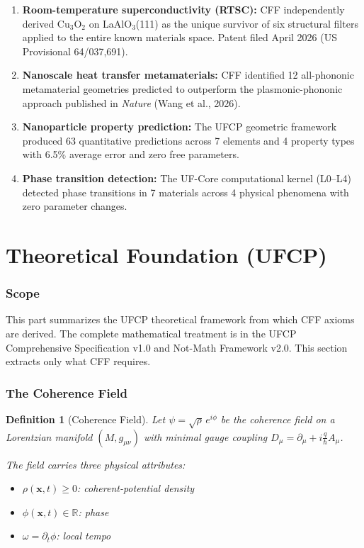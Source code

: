 \documentclass[11pt, a4paper]{article}
\newtheorem{definition}{Definition}[section]
\begin{document}
\begin{enumerate}[nosep]
  \item \textbf{Room-temperature superconductivity (RTSC):}
    CFF independently derived Cu$_3$O$_2$ on LaAlO$_3$(111) as
    the unique survivor of six structural filters applied to
    the entire known materials space. Patent filed April 2026
    (US Provisional 64/037,691).
  \item \textbf{Nanoscale heat transfer metamaterials:}
    CFF identified 12 all-phononic metamaterial geometries
    predicted to outperform the plasmonic-phononic approach
    published in \textit{Nature} (Wang et al., 2026).
  \item \textbf{Nanoparticle property prediction:}
    The UFCP geometric framework produced 63 quantitative
    predictions across 7 elements and 4 property types with
    6.5\% average error and zero free parameters.
  \item \textbf{Phase transition detection:}
    The UF-Core computational kernel (L0--L4) detected phase
    transitions in 7 materials across 4 physical phenomena
    with zero parameter changes.
\end{enumerate}

\newpage
\part{Theoretical Foundation (UFCP)}

\section{Scope}

This part summarizes the UFCP theoretical framework from which
CFF axioms are derived. The complete mathematical treatment is
in the UFCP Comprehensive Specification v1.0 and Not-Math
Framework v2.0. This section extracts only what CFF requires.

\section{The Coherence Field}

\begin{definition}[Coherence Field]
\label{def:coherence-field}
Let $\psi = \sqrt{\rho}\, e^{i\phi}$ be the coherence field on
a Lorentzian manifold $(M, g_{\mu\nu})$ with minimal gauge coupling
$D_\mu = \partial_\mu + i\frac{q}{\hbar}A_\mu$.

The field carries three physical attributes:
\begin{itemize}[nosep]
  \item $\rho(\mathbf{x}, t) \geq 0$: coherent-potential density
  \item $\phi(\mathbf{x}, t) \in \mathbb{R}$: phase
  \item $\omega = \partial_t \phi$: local tempo
\end{itemize}
\end{definition}
\end{document}

